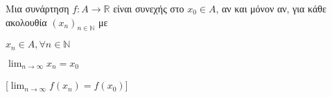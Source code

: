 \documentclass[main.tex]{subfiles}
\begin{document}
\begin{thm}
    Μια συνάρτηση $ f \colon A \to \mathbb{R} $ είναι συνεχής στο $ x_{0} \in A $, 
    αν και μόνον αν, για κάθε ακολουθία $ {(x_{n})}_{n \in \mathbb{N}} $ με

    \vspace{\baselineskip}

    \begin{minipage}{0.25\textwidth}
        \begin{myitemize}
        \item $ x_{n} \in A, \forall n \in \mathbb{N} $ \hfill {}
        \item $ \lim_{n \to \infty} x_{n} = x_{0} $ \hfill {}
        \end{myitemize}
    \end{minipage}
    [$ \lim_{n \to \infty} f(x_{n}) = f(x_{0}) $]
\end{thm}
\end{document}
